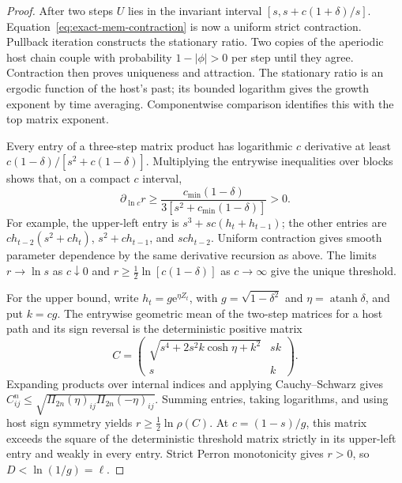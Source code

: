 \begin{proof}
After two steps $U$ lies in the invariant interval
$[s,s+c(1+\delta)/s]$. Equation~\eqref{eq:exact-mem-contraction}
is now a uniform strict contraction. Pullback iteration constructs
the stationary ratio. Two copies of the aperiodic host chain couple
with probability $1-|\phi|>0$ per step until they agree. Contraction
then proves uniqueness and attraction. The stationary ratio is an
ergodic function of the host's past; its bounded logarithm gives the
growth exponent by time averaging. Componentwise comparison identifies
this with the top matrix exponent.

Every entry of a three-step matrix product has logarithmic $c$
derivative at least $c(1-\delta)/[s^2+c(1-\delta)]$.
Multiplying the entrywise inequalities over blocks shows that, on a
compact $c$ interval,
\begin{equation}
 \partial_{\ln c}r\geq
 \frac{c_{\min}(1-\delta)}{3[s^2+c_{\min}(1-\delta)]}>0.
 \label{eq:exact-mem-slope}
\end{equation}
For example, the upper-left entry is $s^3+sc(h_t+h_{t-1})$;
the other entries are $c h_{t-2}(s^2+c h_t)$,
$s^2+c h_{t-1}$, and $sc h_{t-2}$.
Uniform contraction gives smooth parameter dependence by the same
derivative recursion as above. The limits $r\to\ln s$ as $c\downarrow0$
and $r\geq\tfrac12\ln[c(1-\delta)]$ as $c\to\infty$ give the
unique threshold.

For the upper bound, write $h_t=g\mathrm{e}^{\eta Z_t}$, with
$g=\sqrt{1-\delta^2}$ and $\eta=\operatorname{atanh}\delta$, and put
$k=cg$. The entrywise geometric mean of the two-step matrices for a
host path and its sign reversal is the deterministic positive matrix
\begin{equation}
 C=\begin{pmatrix}
 \sqrt{s^4+2s^2k\cosh\eta+k^2}&sk\\s&k
 \end{pmatrix}.
 \label{eq:exact-mem-geometric}
\end{equation}
Expanding products over internal indices and applying Cauchy--Schwarz
gives $C^n_{ij}\leq\sqrt{\Pi_{2n}(\eta)_{ij}\Pi_{2n}(-\eta)_{ij}}$.
Summing entries, taking logarithms, and using host sign symmetry yields
$r\geq\tfrac12\ln\rho(C)$. At $c=(1-s)/g$, this matrix exceeds the
square of the deterministic threshold matrix strictly in its
upper-left entry and weakly in every entry. Strict Perron monotonicity
gives $r>0$, so $D<\ln(1/g)=\ell$.


\end{proof}

